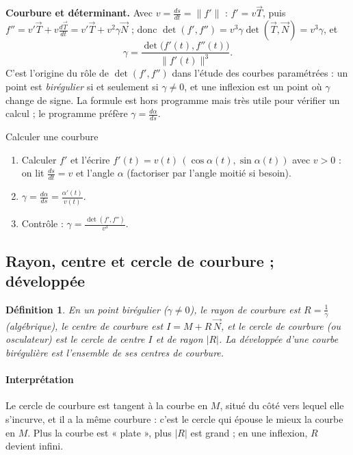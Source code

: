 \documentclass[a4paper,11pt]{article}
\numberwithin{equation}{section}
\numberwithin{figure}{section}
\numberwithin{table}{section}
\theoremstyle{enonce}
\newtheorem{definition}{Définition}[section]
\theoremstyle{exemple}
\theoremstyle{remarque}
\newcommand{\ve}[1]{\vec{#1}}
\begin{document}
\begin{horsprogramme}
\textbf{Courbure et déterminant.} Avec $v=\frac{ds}{dt}=\|f'\|$ : $f'=v\ve T$, puis
$f''=v'\ve T+v\frac{d\ve T}{dt}=v'\ve T+v^2\gamma\ve N$ ; donc $\det(f',f'')=v^3\gamma\det(\ve T,\ve N)=v^3\gamma$, et
\[\gamma=\frac{\det\big(f'(t),f''(t)\big)}{\|f'(t)\|^3}.\]
C'est l'origine du rôle de $\det(f',f'')$ dans l'étude des courbes paramétrées : un point est \emph{birégulier} si et seulement si $\gamma\neq0$,
et une inflexion est un point où $\gamma$ change de signe. La formule est hors programme mais très utile pour vérifier un
calcul ; le programme préfère $\gamma=\frac{d\alpha}{ds}$.
\end{horsprogramme}

\begin{methode}{Calculer une courbure}\label{meth:courbure}
\begin{enumerate}
\item Calculer $f'$ et l'écrire $f'(t)=v(t)\,(\cos\alpha(t),\sin\alpha(t))$ avec $v>0$ : on lit $\frac{ds}{dt}=v$ et l'angle $\alpha$
      (factoriser par l'angle moitié si besoin).
\item $\gamma=\frac{d\alpha}{ds}=\frac{\alpha'(t)}{v(t)}$.
\item Contrôle : $\gamma=\frac{\det(f',f'')}{v^3}$.
\end{enumerate}
\end{methode}

\subsection{Rayon, centre et cercle de courbure ; développée}

\begin{definition}
En un point birégulier ($\gamma\neq0$), le \emph{rayon de courbure} est $R=\frac1\gamma$ (algébrique), le \emph{centre de
courbure} est $I=M+R\,\ve N$, et le \emph{cercle de courbure} (ou osculateur) est le cercle de centre $I$ et de rayon $|R|$.
La \emph{développée} d'une courbe birégulière est l'ensemble de ses centres de courbure.
\end{definition}

\paragraph{Interprétation} Le cercle de courbure est tangent à la courbe en $M$, situé du côté vers lequel elle s'incurve,
et il a la même courbure : c'est le cercle qui épouse le mieux la courbe en $M$. Plus la courbe est « plate », plus $|R|$ est
grand ; en une inflexion, $R$ devient infini.
\end{document}
